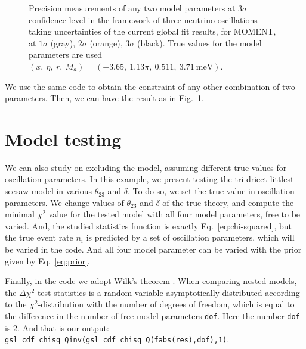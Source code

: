 \documentclass[aps,prd,nofootinbib,preprint]{revtex4}
\begin{document}
\begin{figure}[!h]
 \caption{\label{fig:model_2D}Precision measurements of any two model parameters at 3$\sigma$ confidence level in the framework of three neutrino oscillations taking uncertainties of the current global fit results, for MOMENT, at $1\sigma$ (gray), $2\sigma$ (orange), $3\sigma$ (black). True values for the model parameters are used $(x,~\eta,~r,~M_a)=(-3.65,~1.13\pi,~0.511,~3.71~\text{meV})$.}
\end{figure}


We use the same code to obtain the constraint of any other combination of two parameters. Then, we can have the result as in Fig.~\ref{fig:model_2D}.





\section{Model testing}

We can also study on excluding the model, assuming different true values for oscillation parameters. In this example, we present testing the tri-driect littlest seesaw model in various $\theta_{23}$ and $\delta$. To do so, we set the true value in oscillation parameters. We change values of $\theta_{23}$ and $\delta$ of the true theory, and compute the minimal $\chi^2$ value for the tested model with all four model parameters, free to be varied. And, the studied statistics function is exactly Eq.~\ref{eq:chi-squared}, but the true event rate $n_i$ is predicted by a set of oscillation parameters, which will be varied in the code. And all four model parameter can be varied with the prior given by Eq.~\ref{eq:prior}.

Finally, in the code we adopt Wilk's theorem \cite{Wilks:1938dza}. When comparing nested models, the $\Delta \chi^2$ test statistics is a random variable asymptotically distributed according to the $\chi^2$-distribution with the number of degrees of freedom, which is equal to the difference in the number of free model parameters \texttt{dof}. Here the number \texttt{dof} is $2$. And that is our output: \texttt{gsl\_cdf\_chisq\_Qinv(gsl\_cdf\_chisq\_Q(fabs(res),dof),1)}.
\end{document}
